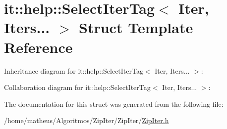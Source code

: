 \hypertarget{structit_1_1help_1_1SelectIterTag_3_01Iter_00_01Iters_8_8_8_01_4}{}\section{it\+:\+:help\+:\+:Select\+Iter\+Tag$<$ Iter, Iters... $>$ Struct Template Reference}
\label{structit_1_1help_1_1SelectIterTag_3_01Iter_00_01Iters_8_8_8_01_4}


Inheritance diagram for it\+:\+:help\+:\+:Select\+Iter\+Tag$<$ Iter, Iters... $>$\+:


Collaboration diagram for it\+:\+:help\+:\+:Select\+Iter\+Tag$<$ Iter, Iters... $>$\+:


The documentation for this struct was generated from the following file\+:\begin{DoxyCompactItemize}
\item 
/home/matheus/\+Algoritmos/\+Zip\+Iter/\+Zip\+Iter/\hyperlink{ZipIter_8h}{Zip\+Iter.\+h}\end{DoxyCompactItemize}
